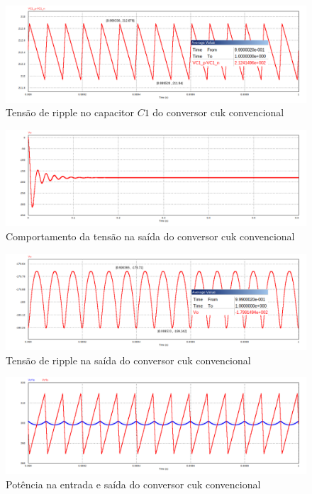 \documentclass[
	12pt,				%
	openright,			%
	onseside,
	a4paper,			%
	english,			%
	french,				%
	spanish,			%
	brazil,				%
	]{abntex2}
\begin{document}
\begin{figure}[htbp]%
	\centering
		\includegraphics[width=0.8 \linewidth]{cuk_conv_ripp_V_C1}
		\caption{Tensão de ripple no capacitor $C1$ do conversor cuk convencional}
		\label{fig:cuk_conv_ripp_V_C1}
\end{figure}

\begin{figure}[htbp]%
	\centering
		\includegraphics[width=0.8 \linewidth]{cuk_conv_V_out}
		\caption{Comportamento da tensão na saída do conversor cuk convencional}
		\label{fig:cuk_conv_ripp_V_out}
\end{figure}

\begin{figure}[htbp]%
	\centering
		\includegraphics[width=0.8 \linewidth]{cuk_conv_ripp_V_out2}
		\caption{Tensão de ripple na saída do conversor cuk convencional}
		\label{fig:cuk_conv_ripp_V_out}
\end{figure}

\begin{figure}[htbp]%
	\centering
		\includegraphics[width=0.8 \linewidth]{cuk_conv_power_sign}
		\caption{Potência na entrada e saída do conversor cuk convencional}
		\label{fig:cuk_conv_power_sign}
\end{figure}
\end{document}
